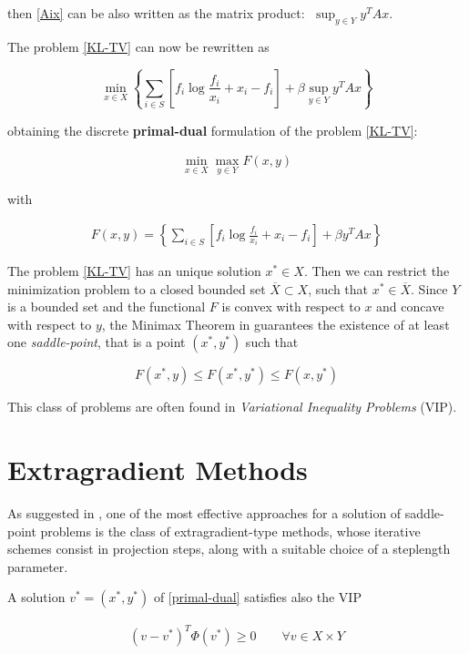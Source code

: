 then \eqref{Aix} can be also written as the matrix product: $\; \displaystyle \sup_{y \in Y} y^T Ax$.

The problem \eqref{KL-TV} can now be rewritten as

$$\min_{x \in X} \left\{ \sum_{i \in S} \left[f_i \log{\frac{f_i}{x_i}}+x_i - f_i\right] + \beta \sup_{y \in Y} y^T Ax \right\}$$

obtaining the discrete \textbf{primal-dual} formulation of the problem \eqref{KL-TV}:

\begin{align}
\label{primal-dual}
\min_{x \in X} \max_{y \in Y} F(x,y)
\end{align}

with

\begin{align}
\label{saddle}
F(x,y) = \left\{ \sum_{i \in S} \left[f_i \log{\frac{f_i}{x_i}}+x_i - f_i\right] + \beta y^T Ax \right\}
\end{align}

The problem  \eqref{KL-TV} has an unique solution $x^* \in X$. Then we can restrict the minimization problem to a closed bounded set $\overline{X} \subset X$, such that $x^* \in \overline{X}$. Since $Y$ is a bounded set and the functional $F$ is convex with respect to $x$ and concave with respect to $y$, the Minimax Theorem in \citep{rockafellar} guarantees the existence of at least one \emph{saddle-point}, that is a point $(x^*,y^*)$ such that

$$F(x^*,y) \leq F(x^*,y^*) \leq F(x,y^*)$$

This class of problems are often found in \emph{Variational Inequality Problems} (VIP).

\section{Extragradient Methods}

As suggested in \citep{aem}, one of the most effective approaches for a solution of saddle-point problems is the class of extragradient-type methods, whose iterative schemes consist in projection steps, along with a suitable choice of a steplength parameter.

A solution $v^* = (x^*,y^*)$ of \eqref{primal-dual} satisfies also the VIP

\begin{align}
\label{vip}
(v-v^*)^T \Phi(v^*) \geq 0 \qquad \forall v \in X \times Y
\end{align}

